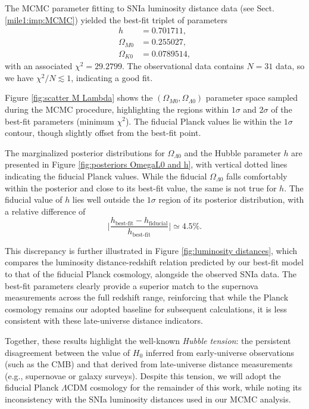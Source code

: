 \documentclass[twocolumn]{aa}
\begin{document}
The MCMC parameter fitting to SNIa luminosity distance data (see Sect.\ref{mile1:imp:MCMC}) yielded the best-fit triplet of parameters
\begin{align*}
      h &= 0.701711,\\
      \Omega_{M0} &= 0.255027,\\
      \Omega_{K0} &= 0.0789514,
\end{align*}
with an associated $\chi^2=29.2799$. The observational data contains $N=31$ data, so we have $\chi^2/N\lesssim 1$, indicating a good fit.

Figure \ref{fig:scatter M Lambda} shows the $(\Omega_{M0}, \Omega_{\Lambda0})$ parameter space sampled during the MCMC procedure, highlighting the regions within $1\sigma$ and $2\sigma$ of the best-fit parameters (minimum $\chi^2$). The fiducial Planck values lie within the $1\sigma$ contour, though slightly offset from the best-fit point.

The marginalized posterior distributions for $\Omega_{\Lambda0}$ and the Hubble parameter $h$ are presented in Figure \ref{fig:posteriors OmegaL0 and h}, with vertical dotted lines indicating the fiducial Planck values. While the fiducial $\Omega_{\Lambda0}$ falls comfortably within the posterior and close to its best-fit value, the same is not true for $h$. The fiducial value of $h$ lies well outside the $1\sigma$ region of its posterior distribution, with a relative difference of
$$\bigg|\frac{h_\text{best-fit}-h_\text{fiducial}}{h_\text{best-fit}}\bigg|\simeq 4.5\%.$$

This discrepancy is further illustrated in Figure \ref{fig:luminosity distances}, which compares the luminosity distance-redshift relation predicted by our best-fit model to that of the fiducial Planck cosmology, alongside the observed SNIa data. The best-fit parameters clearly provide a superior match to the supernova measurements across the full redshift range, reinforcing that while the Planck cosmology remains our adopted baseline for subsequent calculations, it is less consistent with these late-universe distance indicators.

Together, these results highlight the well-known \textit{Hubble tension}: the persistent disagreement between the value of $H_0$ inferred from early-universe observations (such as the CMB) and that derived from late-universe distance measurements (e.g., supernovae or galaxy surveys). Despite this tension, we will adopt the fiducial Planck $\Lambda$CDM cosmology for the remainder of this work, while noting its inconsistency with the SNIa luminosity distances used in our MCMC analysis.
\end{document}
